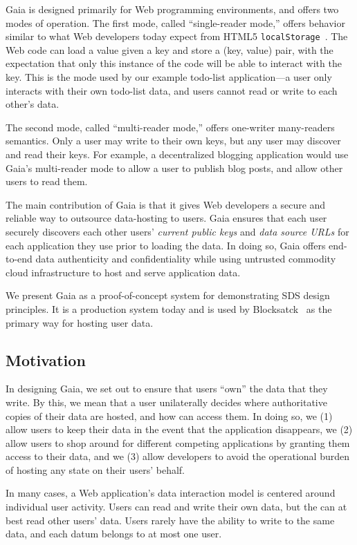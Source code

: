 Gaia is designed primarily for Web programming environments, and offers two
modes of operation.  The first mode, called ``single-reader mode,'' offers
behavior similar to what Web developers today expect from HTML5
\texttt{localStorage}~\cite{w3c-localstorage}.  The Web code can load a value
given a key and store a (key, value) pair, with the expectation that only this
instance of the code will be able to interact with the key.  This is the mode
used by our example todo-list application---a user only interacts with their own
todo-list data, and users cannot read or write to each other's data.

The second mode, called ``multi-reader mode,'' offers one-writer many-readers
semantics.  Only a user may write to their own keys, but any user may discover
and read their keys.  For example, a decentralized blogging application would
use Gaia's multi-reader mode to allow a user to publish blog posts, and allow
other users to read them.

The main contribution of Gaia is that it gives Web developers a secure and
reliable way to outsource data-hosting to users.  Gaia ensures that each user
securely discovers each other users' \emph{current public keys} and \emph{data
source URLs} for each application they use prior to loading the data.
In doing so, Gaia offers end-to-end
data authenticity and confidentiality while using untrusted commodity cloud infrastructure
to host and serve application data.

We present Gaia as a proof-of-concept system for demonstrating SDS design
principles.  It is a production system today and is used by
Blocksatck~\cite{applications} as the primary way for hosting user data.

\subsection{Motivation}

In designing Gaia, we set out to ensure that users ``own'' the data that they
write.  By this, we mean that a user unilaterally decides where authoritative
copies of their data are hosted, and how can access them.  In doing so, we 
(1) allow users to keep their data in the event that the application disappears, we
(2) allow users to shop around for different competing applications by granting them
access to their data, and we (3) allow developers to avoid the operational burden of
hosting any state on their users' behalf.

In many cases, a Web application's data interaction model is centered around
individual user activity.  Users can read and write their own data, but the can
at best read other users' data.  Users rarely have the ability to write to the
same data, and each datum belongs to at most one user.

